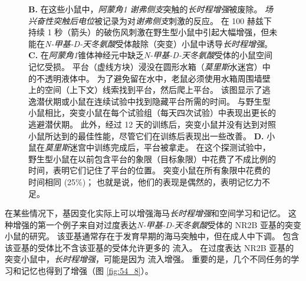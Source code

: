 \begin{figure}[htbp]
{		\textbf{B.} 在这些小鼠中，\textit{阿蒙角1} \textit{谢弗侧支}突触的\textit{长时程增强}被废除。
		\textit{场兴奋性突触后电位}被记录为对\textit{谢弗侧支}刺激的反应。
		在 100 赫兹下持续 1 秒（箭头）的破伤风刺激在野生型小鼠中引起大幅增强，但未能在\textit{N-甲基-D-天冬氨酸}受体敲除（突变）小鼠中诱导\textit{长时程增强}。
		\textbf{C.} 在\textit{阿蒙角1}锥体神经元中缺乏\textit{N-甲基-D-天冬氨酸}受体的小鼠空间记忆受损。
		平台（虚线方块）浸没在圆形水箱（\textit{莫里斯}水迷宫）中的不透明液体中。 为了避免留在水中，老鼠必须使用水箱周围墙壁上的空间（上下文）线索找到平台，然后爬上平台。
		该图显示了逃逸潜伏期或小鼠在连续试验中找到隐藏平台所需的时间。
		与野生型小鼠相比，突变小鼠在每个试验组（每天四次试验）中表现出更长的逃避潜伏期。
		此外，经过 12 天的训练后，突变小鼠并没有达到对照小鼠所达到的最佳性能，尽管它们在训练后表现出一些改善。
		\textbf{D.} 小鼠在\textit{莫里斯}迷宫中训练完成后，平台被拿走。
		在这个探测试验中，野生型小鼠在以前包含平台的象限（目标象限）中花费了不成比例的时间，表明它们记住了平台的位置。
		突变小鼠在所有象限中花费的时间相同 (25\%)；
		也就是说，他们的表现是偶然的，表明记忆力不足。}
	\label{fig:54_7}
\end{figure}


在某些情况下，基因变化实际上可以增强海马\textit{长时程增强}和空间学习和记忆。
这种增强的第一个例子来自对过度表达\textit{N-甲基-D-天冬氨酸}受体的 NR2B 亚基的突变小鼠的研究。
该亚基通常存在于发育早期的海马突触中，但在成人中下调。
包含该亚基的受体比不含该亚基的受体允许更多的  流入。
在过度表达 NR2B 亚基的突变小鼠中，\textit{长时程增强}，可能是因为  流入增强。
重要的是，几个不同任务的学习和记忆也得到了增强（图 \ref{fig:54_8}）。


